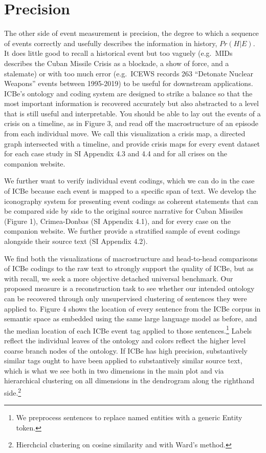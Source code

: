 \documentclass{article}
\begin{document}
\hypertarget{precision}{%
\section{Precision}\label{precision}}

The other side of event measurement is precision, the degree to which a
sequence of events correctly and usefully describes the information in
history, \(Pr(H|E)\). It does little good to recall a historical event
but too vaguely (e.g.~MIDs describes the Cuban Missile Crisis as a
blockade, a show of force, and a stalemate) or with too much error
(e.g.~ICEWS records 263 ``Detonate Nuclear Weapons'' events between
1995-2019) to be useful for downstream applications. ICBe's ontology and
coding system are designed to strike a balance so that the most
important information is recovered accurately but also abstracted to a
level that is still useful and interpretable. You should be able to lay
out the events of a crisis on a timeline, as in Figure 3, and read off
the macrostructure of an episode from each individual move. We call this
visualization a crisis map, a directed graph intersected with a
timeline, and provide crisis maps for every event dataset for each case
study in SI Appendix 4.3 and 4.4 and for all crises on the companion
website.

We further want to verify individual event codings, which we can do in
the case of ICBe because each event is mapped to a specific span of
text. We develop the iconography system for presenting event codings as
coherent statements that can be compared side by side to the original
source narrative for Cuban Missiles (Figure 1), Crimea-Donbas (SI
Appendix 4.1), and for every case on the companion website. We further
provide a stratified sample of event codings alongside their source text
(SI Appendix 4.2).

We find both the visualizations of macrostructure and head-to-head
comparisons of ICBe codings to the raw text to strongly support the
quality of ICBe, but as with recall, we seek a more objective detached
universal benchmark. Our proposed measure is a reconstruction task to
see whether our intended ontology can be recovered through only
unsupervised clustering of sentences they were applied to. Figure 4
shows the location of every sentence from the ICBe corpus in semantic
space as embedded using the same large language model as before, and the
median location of each ICBe event tag applied to those
sentences.\footnote{We preprocess sentences to replace named entities
  with a generic Entity token.} Labels reflect the individual leaves of
the ontology and colors reflect the higher level coarse branch nodes of
the ontology. If ICBe has high precision, substantively similar tags
ought to have been applied to substantively similar source text, which
is what we see both in two dimensions in the main plot and via
hierarchical clustering on all dimensions in the dendrogram along the
righthand side.\footnote{Hierchcial clustering on cosine similarity and
  with Ward's method.}
\end{document}
